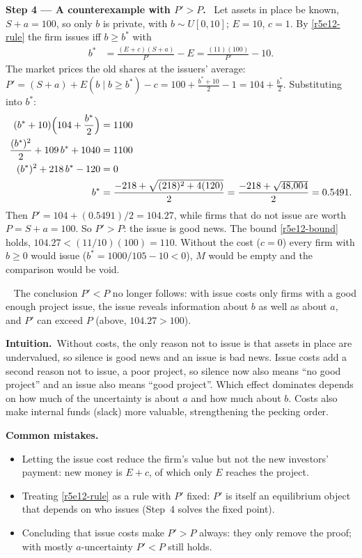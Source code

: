\documentclass[11pt,a4paper]{article}
\newcommand{\step}[2]{\par\medskip\noindent\textbf{Step #1 --- #2.}~}
\newcommand{\intuition}{\par\medskip\noindent\textbf{Intuition.}~}
\newcommand{\answer}[1]{\par\smallskip\noindent\fbox{\textbf{Answer #1.}}~}
\newcommand{\pitfalls}{\par\medskip\noindent\textbf{Common mistakes.}}
\begin{document}
\step{4}{A counterexample with $P'>P$} Let assets in place be known, $S+a=100$, so only $b$ is private, with $b\sim U[0,10]$; $E=10$, $c=1$. By \eqref{r5e12-rule} the firm issues iff $b\ge b^*$ with
\begin{align}
  b^* &= \frac{(E+c)(S+a)}{P'} - E = \frac{(11)(100)}{P'} - 10. \nonumber
\end{align}
The market prices the old shares at the issuers' average: $P' = (S+a) + E(b\mid b\ge b^*) - c = 100 + \tfrac{b^*+10}{2} - 1 = 104 + \tfrac{b^*}{2}$. Substituting into $b^*$:
\begin{align}
  (b^*+10)\Bigl(104+\frac{b^*}{2}\Bigr) &= 1100 \nonumber\\
  \frac{(b^*)^2}{2} + 109\,b^* + 1040 &= 1100 \nonumber\\
  (b^*)^2 + 218\,b^* - 120 &= 0 \nonumber\\
  b^* &= \frac{-218+\sqrt{(218)^2+4(120)}}{2} = \frac{-218+\sqrt{48{,}004}}{2} = 0.5491. \nonumber
\end{align}
Then $P' = 104 + (0.5491)/2 = 104.27$, while firms that do not issue are worth $P=S+a=100$. So $P'>P$: the issue is good news. The bound \eqref{r5e12-bound} holds, $104.27<(11/10)(100)=110$. Without the cost ($c=0$) every firm with $b\ge0$ would issue ($b^*=1000/105-10<0$), $M$ would be empty and the comparison would be void.
\answer{(b)} The conclusion $P'<P$ no longer follows: with issue costs only firms with a good enough project issue, the issue reveals information about $b$ as well as about $a$, and $P'$ can exceed $P$ (above, $104.27>100$).

\intuition Without costs, the only reason not to issue is that assets in place are undervalued, so silence is good news and an issue is bad news. Issue costs add a second reason not to issue, a poor project, so silence now also means ``no good project'' and an issue also means ``good project''. Which effect dominates depends on how much of the uncertainty is about $a$ and how much about $b$. Costs also make internal funds (slack) more valuable, strengthening the pecking order.

\pitfalls
\begin{itemize}
  \item Letting the issue cost reduce the firm's value but not the new investors' payment: new money is $E+c$, of which only $E$ reaches the project.
  \item Treating \eqref{r5e12-rule} as a rule with $P'$ fixed: $P'$ is itself an equilibrium object that depends on who issues (Step~4 solves the fixed point).
  \item Concluding that issue costs make $P'>P$ always: they only remove the proof; with mostly $a$-uncertainty $P'<P$ still holds.
\end{itemize}
\end{document}
